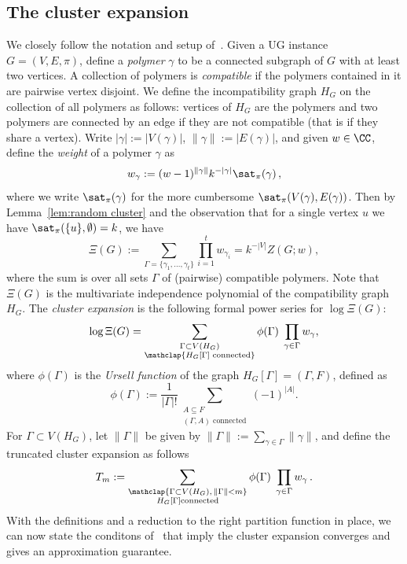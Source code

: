 \subsection{The cluster expansion}
%
We closely follow the notation and setup of~\cite{BCHPT19,HPR19}. Given a UG instance $G=(V,E,\pi)$, define a \emph{polymer} $\gamma$ to be a connected subgraph of $G$ with at least two vertices. A collection of polymers is \emph{compatible} if the polymers contained in it are pairwise vertex disjoint.
We define the incompatibility graph $H_G$ on the collection of all polymers as follows: vertices of $H_G$ are the polymers and two polymers are connected by an edge if they are not compatible (that is if they share a vertex). 
Write $|\gamma|:=|V(\gamma)|$, $\|\gamma \|:=|E(\gamma)|$, and given $w\in\CC$, define the \emph{weight} of a polymer $\gamma$ as 
\[
w_\gamma:=(w-1)^{\|\gamma\|}k^{-|\gamma|}\sat_\pi(\gamma)\,,
\]
where we write $\sat_\pi(\gamma)$ for the more cumbersome $\sat_\pi(V(\gamma),E(\gamma))$.
Then by Lemma~\ref{lem:random cluster} and the observation that for a single vertex $u$ we have $\sat_\pi(\{u\},\emptyset)=k$, we have 
\[
\Xi(G):=\sum_{\Gamma=\{\gamma_1,\ldots,\gamma_t\}}\prod_{i=1}^t w_{\gamma_i}=k^{-|V|}Z(G;w),
\]
where the sum is over all sets $\Gamma$ of (pairwise) compatible polymers. 
Note that $\Xi(G)$ is the multivariate independence polynomial of the compatibility graph $H_G$.
%
%
The \emph{cluster expansion} is the following formal power series for $\log\Xi(G)$:
\begin{equation}\label{eq:cluster expansion}
\log\Xi(G)=\sum_{\substack{\Gamma\subset V(H_G)\\\mathclap{H_G[\Gamma] \text{ connected}}}}\phi(\Gamma)\;\prod_{\gamma\in \Gamma}w_\gamma,
\end{equation}
where $\phi(\Gamma)$ is the \emph{Ursell function} of the graph $H_G[\Gamma]=(\Gamma,F)$, defined as
\[
\phi(\Gamma):=
\frac{1}{|\Gamma|!}\sum_{\substack{A\subseteq F\\ (\Gamma, A)\text{ connected}}} (-1)^{|A|}.
\]
For $\Gamma\subset V(H_G)$, let $\|\Gamma\|$ be given by $\|\Gamma\|:=\sum_{\gamma\in \Gamma}\|\gamma\|$, and define the truncated cluster expansion as follows
\begin{equation}
T_m:=\sum_{\substack{\mathclap{\Gamma\subset V(H_G),\, \|\Gamma\|< m}\\H_G[\Gamma] \text{connected}}}\phi(\Gamma)\;\prod_{\gamma\in \Gamma}w_\gamma\,.
\end{equation}
%
With the definitions and a reduction to the right partition function in place, we can now state the conditons of~\cite{BCHPT19} that imply the cluster expansion converges and gives an approximation guarantee.
